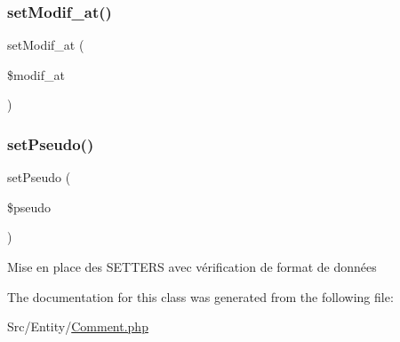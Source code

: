 \subsubsection{\texorpdfstring{set\+Modif\+\_\+at()}{setModif\_at()}}
{\footnotesize\ttfamily set\+Modif\+\_\+at (\begin{DoxyParamCaption}\item[{Date\+Time}]{\$modif\+\_\+at }\end{DoxyParamCaption})}

\mbox{\label{class_src_1_1_entity_1_1_comment_a1d65ce1d25ffb871a48d33715e6b6bef}} 
\subsubsection{\texorpdfstring{set\+Pseudo()}{setPseudo()}}
{\footnotesize\ttfamily set\+Pseudo (\begin{DoxyParamCaption}\item[{}]{\$pseudo }\end{DoxyParamCaption})}

Mise en place des S\+E\+T\+T\+E\+RS avec vérification de format de données 

The documentation for this class was generated from the following file\+:\begin{DoxyCompactItemize}
\item 
Src/\+Entity/\hyperlink{_comment_8php}{Comment.\+php}\end{DoxyCompactItemize}
